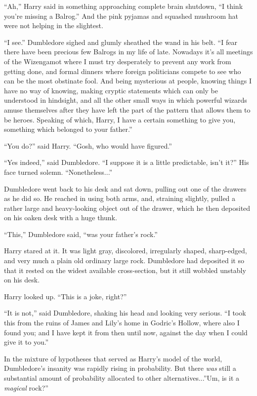 ``Ah,'' Harry said in something approaching complete brain shutdown, ``I
think you're missing a Balrog.'' And the pink pyjamas and squashed
mushroom hat were not helping in the slightest.

``I see.'' Dumbledore sighed and glumly sheathed the wand in his belt.
``I fear there have been precious few Balrogs in my life of late.
Nowadays it's all meetings of the Wizengamot where I must try
desperately to prevent any work from getting done, and formal dinners
where foreign politicians compete to see who can be the most obstinate
fool. And being mysterious at people, knowing things I have no way of
knowing, making cryptic statements which can only be understood in
hindsight, and all the other small ways in which powerful wizards amuse
themselves after they have left the part of the pattern that allows them
to be heroes. Speaking of which, Harry, I have a certain something to
give you, something which belonged to your father.''

``You do?'' said Harry. ``Gosh, who would have figured.''

``Yes indeed,'' said Dumbledore. ``I suppose it is a little predictable,
isn't it?'' His face turned solemn. ``Nonetheless...''

Dumbledore went back to his desk and sat down, pulling out one of the
drawers as he did so. He reached in using both arms, and, straining
slightly, pulled a rather large and heavy-looking object out of the
drawer, which he then deposited on his oaken desk with a huge thunk.

``This,'' Dumbledore said, ``was your father's rock.''

Harry stared at it. It was light gray, discolored, irregularly shaped,
sharp-edged, and very much a plain old ordinary large rock. Dumbledore
had deposited it so that it rested on the widest available
cross-section, but it still wobbled unstably on his desk.

Harry looked up. ``This is a joke, right?''

``It is not,'' said Dumbledore, shaking his head and looking very
serious. ``I took this from the ruins of James and Lily's home in
Godric's Hollow, where also I found you; and I have kept it from then
until now, against the day when I could give it to you.''

In the mixture of hypotheses that served as Harry's model of the world,
Dumbledore's insanity was rapidly rising in probability. But there
\emph{was} still a substantial amount of probability allocated to other
alternatives...''Um, is it a \emph{magical} rock?''

